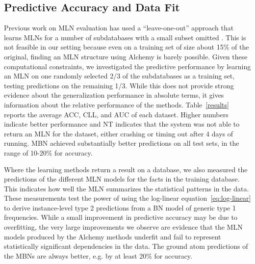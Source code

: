 \documentclass[letterpaper]{article}
\begin{document}
\subsection{Predictive Accuracy and Data Fit}

Previous work on MLN evaluation has used a ``leave-one-out'' approach that learns MLNs for a number of subdatabases with a small subset omitted \cite{Mihalkova2007}. This is not feasible in our setting 
because even on a training set of size about 15\% of the original, finding an MLN structure using Alchemy is barely possible. Given these computational constraints, we investigated the predictive performance by learning an MLN on one randomly selected 2/3 of the subdatabases as a training set, testing predictions on the remaining 1/3. While this does not provide strong evidence about the 
generalization performance in absolute terms, it gives information about the relative performance of the methods. Table~\ref{results} reports the average ACC, CLL, and AUC of each dataset. Higher numbers indicate better performance and NT indicates that the system was not able to return an MLN for the dataset, either crashing or timing out after 4 days of running. MBN achieved substantially better predictions on all test sets, in the range of 10-20\% for accuracy. 

Where the learning methods return a result on a database, we also measured the 
predictions 
of the different MLN models 
for the facts in the training database. This indicates how well the MLN summarizes the statistical patterns in the data. %
These measurements test the power of using the log-linear equation~\eqref{eq:log-linear} to derive instance-level type 2 predictions from a BN model of generic type 1 frequencies. While a small improvement in predictive accuracy may be due to overfitting, the very large improvements we observe are evidence that the MLN models produced by the Alchemy methods underfit and fail to represent statistically significant dependencies in the data.
The ground atom predictions of the MBNs are always better, e.g. by at least 20\% for accuracy. 
\end{document}
